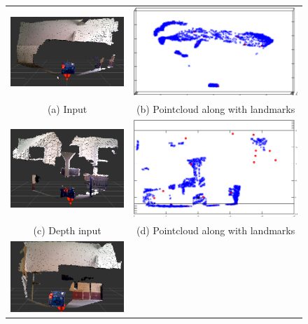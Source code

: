 \documentclass[twoside,hidelinks]{article}
\begin{document}
\begin{figure}
\begin{tabular}{cc}
\includegraphics[width=60mm]{box/input1} & 
  \includegraphics[width=85mm]{box/clusters1} \\
(a) Input  & (b) Pointcloud along with landmarks\\[6pt]
	\includegraphics[width=60mm]{box/input2} & 
  \includegraphics[width=85mm]{box/clusters2} \\
(c) Depth input & (d) Pointcloud along with landmarks \\[6pt]
	\includegraphics[width=60mm]{box/input3} & 

\end{tabular}
\end{figure}
\end{document}
